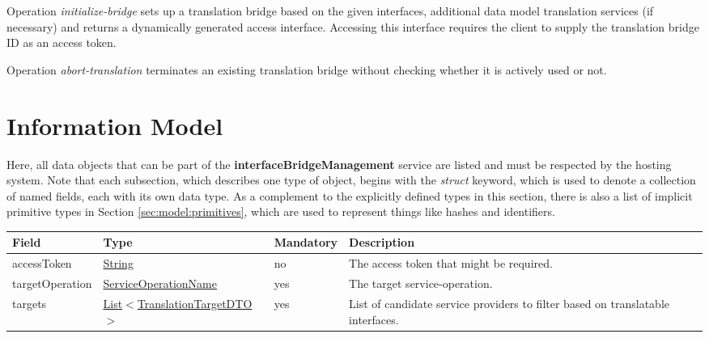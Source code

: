 \documentclass[a4paper]{arrowhead}
\newcommand{\pref}[1]{{\textcolor{ArrowheadGrey}{\hyperref[sec:model:primitives:#1]{#1}}}}
\begin{document}

Operation \textit{initialize-bridge} sets up a translation bridge based on the given interfaces, additional data model translation services (if necessary) and returns a dynamically generated access interface. Accessing this interface requires the client to supply the translation bridge ID as an access token.


Operation \textit{abort-translation} terminates an existing translation bridge without checking whether it is actively used or not.

\clearpage

\section{Information Model}
\label{sec:model}

Here, all data objects that can be part of the \textbf{interfaceBridgeManagement} service are listed and must be respected by the hosting system.
Note that each subsection, which describes one type of object, begins with the \textit{struct} keyword, which is used to denote a collection of named fields, each with its own data type.
As a complement to the explicitly defined types in this section, there is also a list of implicit primitive types in Section \ref{sec:model:primitives}, which are used to represent things like hashes and identifiers.

{}
 
\begin{table}[ht!]
\begin{tabularx}{\textwidth}{| p{3cm} | p{4.9cm} | p{2cm} | X |} \hline
\rowcolor{gray!33} Field & Type & Mandatory & Description \\ \hline
accessToken & \pref{String} & no & The access token that might be required. \\ \hline
targetOperation & \pref{ServiceOperationName} & yes & The target service-operation. \\ \hline
targets & \pref{List}$<$\hyperref[sec:model:TranslationTargetDTO]{TranslationTargetDTO}$>$ & yes & List of candidate service providers to filter based on translatable interfaces. \\ \hline
\end{tabularx}
\end{table}
\end{document}

